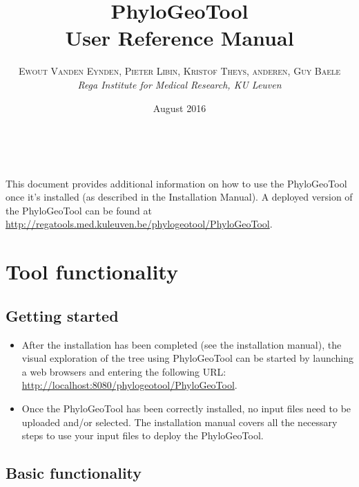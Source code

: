 \documentclass[a4paper, 11pt]{article} %
\title{\textbf{PhyloGeoTool}\\ %
User Reference Manual} %
\author{\textsc{Ewout Vanden Eynden, Pieter Libin, Kristof Theys, anderen, Guy Baele} %
\\{\textit{Rega Institute for Medical Research, KU Leuven}}} %
\date{August 2016} %
\makeatletter
\renewcommand{\maketitle}{ %
\begin{flushright} %
{\LARGE\@title} %

\vspace{50pt} %

{\large\@author} %
\\\@date %

\vspace{40pt} %
\end{flushright}
}
\makeatother
\begin{document}
\maketitle %

\vspace{30pt} %

\tableofcontents
\newpage

This document provides additional information on how to use the PhyloGeoTool once it's installed (as described in the Installation Manual).
A deployed version of the PhyloGeoTool can be found at \url{http://regatools.med.kuleuven.be/phylogeotool/PhyloGeoTool}.

\section{Tool functionality}

\subsection{Getting started}

\begin{itemize}
\item After the installation has been completed (see the installation manual), the visual exploration of the tree using PhyloGeoTool can be started by launching a web browsers and entering the following URL: \url{http://localhost:8080/phylogeotool/PhyloGeoTool}.
\item Once the PhyloGeoTool has been correctly installed, no input files need to be uploaded and/or selected. The installation manual covers all the necessary steps to use your input files to deploy the PhyloGeoTool.
\end{itemize}


\subsection{Basic functionality}
\end{document}
